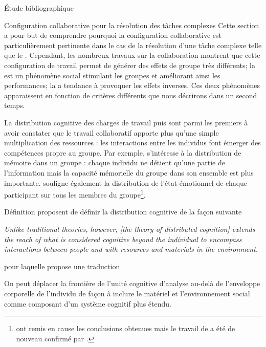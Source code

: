 \documentclass[myfrancais,ngerman,english,french]{mythesis}
\begin{document}
\begin{mychapter}{Étude bibliographique}
\begin{mysection}{Configuration collaborative pour la résolution des tâches complexes}
			Cette section a pour but de comprendre pourquoi la configuration collaborative est particulièrement pertinente dans le cas de la résolution d'une tâche complexe telle que le .
			Cependant, les nombreux travaux sur la collaboration montrent que cette configuration de travail permet de générer des effets de groupe très différents; la  est un phénomène social stimulant les groupes et améliorant ainsi les performances; la  a tendance à provoquer les effets inverses.
			Ces deux phénomènes apparaissent en fonction de critères différents que nous décrirons dans un second temps.
			\begin{mysubsection}{La distribution cognitive des charges de travail}
				 puis  sont parmi les premiers à avoir constater que le travail collaboratif apporte plus qu'une simple multiplication des ressources : les interactions entre les individus font émerger des compétences propre au groupe.
				Par exemple,  s'intéresse à la distribution de mémoire dans un groupe : chaque individu ne détient qu'une partie de l'information mais la capacité mémorielle du groupe dans son ensemble est plus importante.
				 souligne également la distribution de l'état émotionnel de chaque participant sur tous les membres du groupe\footnote{ ont remis en cause les conclusions obtenues mais le travail de  a été de nouveau confirmé par .}.
				\begin{mysubsubsection}{Définition}
					 proposent de définir la distribution cognitive de la façon suivante
					\begin{myquote}[english]
						\it Unlike traditional theories, however, [the theory of distributed cognition] extends the reach of what is considered cognitive beyond the individual to encompass interactions between people and with resources and materials in the environment.
					\end{myquote}
					pour laquelle  propose une traduction
					\begin{myquote}[french]
						On peut déplacer la frontière de l'unité cognitive d'analyse au-delà de l'enveloppe corporelle de l'individu de façon à inclure le matériel et l'environnement social comme composant d'un système cognitif plus étendu.
					\end{myquote}


\end{mysubsubsection}
\end{mysubsection}
\end{mysection}
\end{mychapter}
\end{document}
